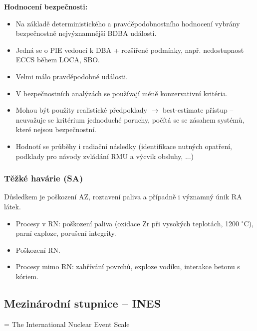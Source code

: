 \textbf{Hodnocení bezpečnosti:}

\begin{itemize}
    \item Na základě deterministického a pravděpodobnostního hodnocení vybrány bezpečnostně nejvýznamnější BDBA události.
    \item Jedná se o PIE vedoucí k DBA + rozšířené podmínky, např. nedostupnost ECCS během LOCA, SBO.
    \item Velmi málo pravděpodobné události.
    \item V bezpečnostních analýzách se používají méně konzervativní kritéria.
    \item Mohou být použity realistické předpoklady $\rightarrow$ best-estimate přístup -- neuvažuje se kritérium jednoduché poruchy, počítá se se zásahem systémů, které nejsou bezpečnostní.
    \item Hodnotí se průběhy i radiační následky (identifikace nutných opatření, podklady pro návody zvládání RMU a výcvik obsluhy, ...)
\end{itemize}

\subsubsection{Těžké havárie (SA)}

Důsledkem je poškození AZ, roztavení paliva a případně i významný únik RA látek.

\begin{itemize}
    \item Procesy v RN: poškození paliva (oxidace Zr při vysokých teplotách, 1200 $^\circ$C), parní exploze, porušení integrity.
    \item Poškození RN.
    \item Procesy mimo RN: zahřívání povrchů, exploze vodíku, interakce betonu s kóriem.
\end{itemize}

\subsection{Mezinárodní stupnice -- INES}

= The International Nuclear Event Scale

